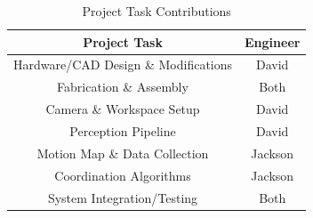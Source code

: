 \documentclass[conference]{IEEEtran}
\begin{document}
\begin{table} [H]
    \centering
    \begin{tabular}{|c|c|}\hline
         Project Task& Engineer\\\hline
         Hardware/CAD Design \& Modifications& David\\\hline
         Fabrication \& Assembly& Both\\\hline
         Camera \& Workspace Setup& David\\\hline
         Perception Pipeline& David\\\hline
         Motion Map \& Data Collection& Jackson\\\hline
         Coordination Algorithms& Jackson\\\hline
         System Integration/Testing& Both\\ \hline
    \end{tabular}
    \caption{Project Task Contributions}
    \label{tab:project task contributions table}
\end{table}








\end{document}
